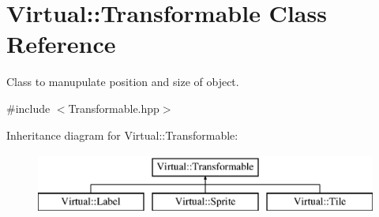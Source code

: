 \hypertarget{class_virtual_1_1_transformable}{}\section{Virtual\+:\+:Transformable Class Reference}
\label{class_virtual_1_1_transformable}


Class to manupulate position and size of object.  




{\ttfamily \#include $<$Transformable.\+hpp$>$}

Inheritance diagram for Virtual\+:\+:Transformable\+:\begin{figure}[H]
\begin{center}
\leavevmode
\includegraphics[height=2.000000cm]{class_virtual_1_1_transformable}
\end{center}
\end{figure}
